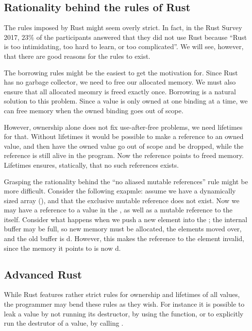 \documentclass[b5paper,twoside]{report}
\begin{document}


\subsection{Rationality behind the rules of Rust}
The rules imposed by Rust might seem overly strict.  In fact, in the Rust
Survey 2017, $23\%$ of the participants answered that they did not use Rust
because ``Rust is too intimidating, too hard to learn, or too
complicated''\cite{rustsurvey2017}.  We will see, however, that there are good
reasons for the rules to exist.

The borrowing rules might be the easiest to get the motivation for.  Since Rust
has no garbage collector, we need to free our allocated memory.  We must also
ensure that all allocated meomry is freed exactly once.  Borrowing is a natural
solution to this problem. Since a value is only owned at one binding at a time,
we can free memory when the owned binding goes out of scope.

However, ownership alone does not fix use-after-free problems, we need
lifetimes for that.  Without lifetimes it would be possible to make a reference
to an owned value, and then have the owned value go out of scope and be
dropped, while the reference is still alive in the program. Now the reference
points to freed memory. Lifetimes ensures, statically, that no such references
exists.

Grasping the rationality behind the ``no aliased mutable references'' rule
might be more difficult. Consider the following exapmle: assume we have a
dynamically sized array (), and that the exclusive mutable reference
does not exist. Now we may have a reference to a value in the , as
well as a mutable reference to the  itself.  Consider what happens
when we push a new element into the ; the internal buffer may be
full, so new memory must be allocated, the elements moved over, and the old
buffer is d.  However, this makes the reference to the element
invalid, since the memory it points to is now d.

\subsection{Advanced Rust}
While Rust features rather strict rules for ownership and lifetimes of all
values, the programmer may bend these rules as they wish.  For instance it is
possible to leak a value by not running its destructor, by using the
 function, or to explicitly run the destrutor of a
value, by calling .
\end{document}
